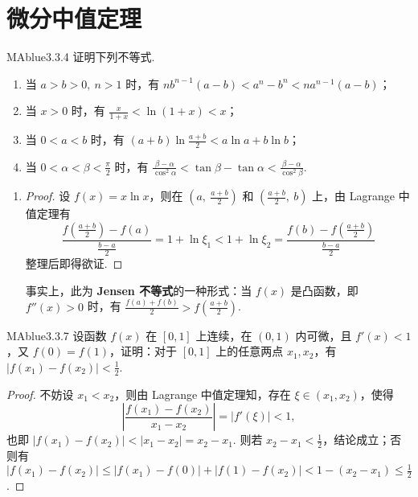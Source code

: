 \section{微分中值定理}

\begin{problem}{MAblue}{3.3.4}
    证明下列不等式.
    \begin{enumerate}
        \item[(1)]
        当 $a > b > 0,\ n > 1$ 时，有 $nb^{n-1}(a-b) < a^n - b^n < na^{n-1}(a-b)$；
        \item[(2)]
        当 $x > 0$ 时，有 $\frac x {1+x} < \ln(1+x) < x$；
        \item[(3)]
        当 $0 < a < b$ 时，有 $(a+b) \ln \frac {a+b} 2 < a \ln a + b \ln b$；
        \item[(4)]
        当 $0 < \alpha < \beta < \frac \pi 2$ 时，有 $\frac{\beta-\alpha}{\cos^2\alpha} < \tan \beta - \tan \alpha < \frac{\beta-\alpha}{\cos^2\beta}$.
    \end{enumerate}
\end{problem}

\begin{enumerate}
    \item[(3)]
    \begin{proof}
        设 $f(x) = x \ln x$，则在 $\left( a,\ \frac {a+b} 2 \right)$ 和 $\left( \frac {a+b} 2,\ b \right)$ 上，由 Lagrange 中值定理有
        \[
            \frac{f\left( \frac {a+b} 2 \right) - f(a)}{\frac {b-a} 2} = 1 + \ln \xi_1 < 1 + \ln \xi_2 = \frac{f(b) - f\left( \frac {a+b} 2 \right)}{\frac {b-a} 2}
        \]
        整理后即得欲证.
    \end{proof}
    事实上，此为 \textbf{Jensen 不等式}的一种形式：当 $f(x)$ 是凸函数，即 $f''(x) > 0$ 时，有 $\frac {f(a) + f(b)} 2 > f(\frac {a+b} 2)$.
\end{enumerate}

\begin{problem}{MAblue}{3.3.7}
    设函数 $f(x)$ 在 $[0, 1]$ 上连续，在 $(0, 1)$ 内可微，且 $f'(x) < 1$，又 $f(0) = f(1)$，证明：对于 $[0, 1]$ 上的任意两点 $x_1, x_2$，有 $|f(x_1) - f(x_2)| < \frac 1 2$.
\end{problem}

\begin{proof}
    不妨设 $x_1 < x_2$，则由 Lagrange 中值定理知，存在 $\xi \in (x_1, x_2)$，使得
    \[
        \left| \frac{f(x_1) - f(x_2)}{x_1 - x_2} \right| = |f'(\xi)| < 1,
    \]
    也即 $|f(x_1) - f(x_2)| < |x_1 - x_2| = x_2 - x_1$. 则若 $x_2 - x_1 < \frac 1 2$，结论成立；否则有 $|f(x_1) - f(x_2)| \leqslant |f(x_1) - f(0)| + |f(1) - f(x_2)| < 1 - (x_2 - x_1) \leqslant \frac 1 2$.
\end{proof}


